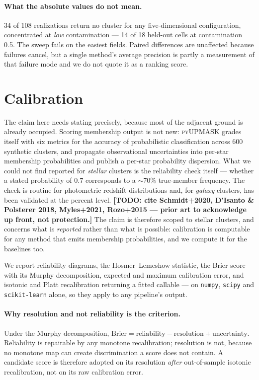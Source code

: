 \documentclass{aa}
\newcommand{\TODO}[1]{\textbf{[TODO: #1]}}
\begin{document}
\paragraph{What the absolute values do not mean.}
34 of 108 realizations return no cluster for any five-dimensional configuration, concentrated at
\emph{low} contamination --- 14 of 18 held-out cells at contamination 0.5. The sweep fails on the
easiest fields. Paired differences are unaffected because failures cancel, but a single method's
average precision is partly a measurement of that failure mode and we do not quote it as a
ranking score.

\section{Calibration}
\label{sec:calibration}

The claim here needs stating precisely, because most of the adjacent ground is already occupied.
Scoring membership output is not new: \textsc{pyUPMASK} grades itself with six metrics for the
accuracy of probabilistic classification across 600 synthetic clusters, and \citet{olivares2018}
propagate observational uncertainties into per-star membership probabilities and publish a
per-star probability dispersion. What we could not find reported for \emph{stellar} clusters is
the reliability check itself --- whether a stated probability of $0.7$ corresponds to a
$\sim$70\% true-member frequency. The check is routine for photometric-redshift distributions and,
for \emph{galaxy} clusters, has been validated at the percent level. \TODO{cite Schmidt+2020,
D'Isanto \& Polsterer 2018, Myles+2021, Rozo+2015 --- prior art to acknowledge up front, not
protection.} The claim is therefore scoped to stellar clusters, and concerns what is
\emph{reported} rather than what is possible: calibration is computable for any method that emits
membership probabilities, and we compute it for the baselines too.

We report reliability diagrams, the Hosmer--Lemeshow statistic, the Brier score with its Murphy
decomposition, expected and maximum calibration error, and isotonic and Platt recalibration
returning a fitted callable --- on \texttt{numpy}, \texttt{scipy} and \texttt{scikit-learn} alone,
so they apply to any pipeline's output.

\paragraph{Why resolution and not reliability is the criterion.} Under the Murphy decomposition,
$\mathrm{Brier} = \mathrm{reliability} - \mathrm{resolution} + \mathrm{uncertainty}$. Reliability
is repairable by any monotone recalibration; resolution is not, because no monotone map can create
discrimination a score does not contain. A candidate score is therefore adopted on its resolution
\emph{after} out-of-sample isotonic recalibration, not on its raw calibration error.
\end{document}
